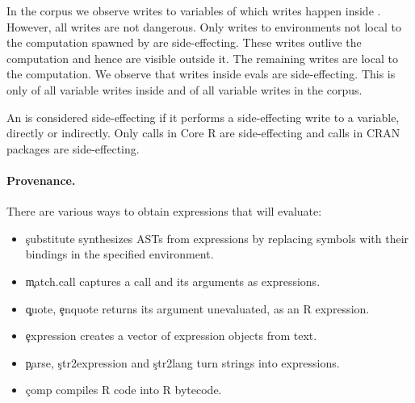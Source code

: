\documentclass[screen,acmsmall]{acmart}
\begin{document}
In the corpus we observe \AllWritesRnd writes to variables of which
\EvalWritesRnd writes happen inside \eval. However, all writes are not
dangerous. Only writes to environments not local to the computation spawned by
\eval are side-effecting. These writes outlive the computation and hence are
visible outside it. The remaining writes are local to the computation. We
observe that \EvalSideEffectingWritesRnd writes inside evals are side-effecting.
This is only \EvalSideEffectingWritesEvalPerc of all variable writes inside
\eval and \EvalSideEffectingWritesAllPerc of all variable writes in the corpus.

An \eval is considered side-effecting if it performs a side-effecting write to a
variable, directly or indirectly. Only \SideEffectingCoreCallPerc \eval calls in
Core R are side-effecting and \SideEffectingPackageCallPerc \eval calls in CRAN
packages are side-effecting.

\paragraph{Provenance.} 
There are various ways to obtain expressions that \eval will evaluate:
\begin{itemize}
    \item \c{substitute} synthesizes ASTs from expressions by replacing
    symbols with their bindings in the specified environment.
    \item \c{match.call} captures a call and its arguments as expressions.
    \item \c{quote}, \c{enquote} returns its argument unevaluated, as an R expression.
    \item \c{expression}  creates a vector of expression
    objects from text.
    \item \c{parse}, \c{str2expression} and \c{str2lang} turn strings into
    expressions.
    \item \c{comp} compiles R code into R bytecode.
\end{itemize}
\end{document}
